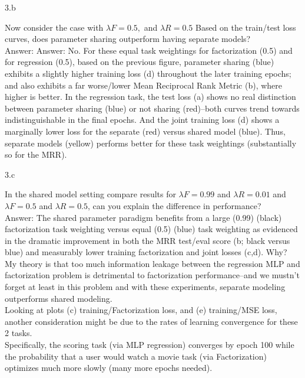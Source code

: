\clearpage

\LARGE
3.b
\normalsize

\begin{answer}

Now consider the case with 
$ \lambda F = 0.5, $ and $ \lambda  R  = 0.5 $ 
Based on the train/test loss curves, does parameter sharing outperform having separate models?
\\

Answer: 
Answer: No. For these equal task weightings for factorization (0.5) and for regression (0.5), based on the previous figure, parameter sharing (blue) exhibits a slightly higher training loss (d) throughout the later training epochs; and also exhibits a far worse/lower Mean Reciprocal Rank Metric (b), where higher is better. In the regression task, the test loss (a) shows no real distinction between parameter sharing (blue) or not sharing (red)--both curves trend towards indistinguishable in the final epochs. And the joint training loss (d) shows a marginally lower loss for the separate (red) versus shared model (blue). Thus, separate models (yellow) performs better for these task weightings (substantially so for the MRR).
    
\end{answer}

\clearpage

\LARGE
3.c
\normalsize

\begin{answer}

In the shared model setting compare results for $ \lambda F = 0.99 $ and $ \lambda R = 0.01 $ and $ \lambda F = 0.5 $ and $ \lambda R = 0.5 $, can you explain the difference in performance?
\\

Answer: The shared parameter paradigm benefits from a large (0.99) (black) factorization task weighting versus equal (0.5) (blue) task weighting as evidenced in the dramatic improvement in both the MRR test/eval score (b; black versus blue) and measurably lower training factorization and joint losses (c,d). Why? My theory is that too much information leakage between the regression MLP and factorization problem is detrimental to factorization performance--and we mustn't forget at least in this problem and with these experiments, separate modeling outperforms shared modeling. 
\\

Looking at plots (c) training/Factorization loss, and (e) training/MSE loss, another consideration might be due to the rates of learning convergence for these 2 tasks. 
\\

Specifically, the scoring task (via MLP regression) converges by epoch 100 while the probability that a user would watch a movie task (via Factorization) optimizes much more slowly (many more epochs needed). 
\end{answer}


